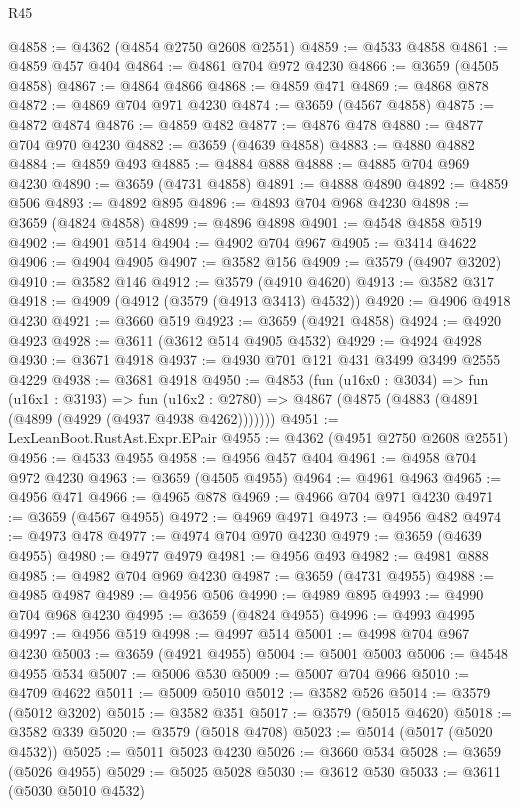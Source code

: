 \begin{lexlean}{R45}
\begin{coremodule}
@4858 := @4362 (@4854 @2750 @2608 @2551)
@4859 := @4533 @4858
@4861 := @4859 @457 @404
@4864 := @4861 @704 @972 @4230
@4866 := @3659 (@4505 @4858)
@4867 := @4864 @4866
@4868 := @4859 @471
@4869 := @4868 @878
@4872 := @4869 @704 @971 @4230
@4874 := @3659 (@4567 @4858)
@4875 := @4872 @4874
@4876 := @4859 @482
@4877 := @4876 @478
@4880 := @4877 @704 @970 @4230
@4882 := @3659 (@4639 @4858)
@4883 := @4880 @4882
@4884 := @4859 @493
@4885 := @4884 @888
@4888 := @4885 @704 @969 @4230
@4890 := @3659 (@4731 @4858)
@4891 := @4888 @4890
@4892 := @4859 @506
@4893 := @4892 @895
@4896 := @4893 @704 @968 @4230
@4898 := @3659 (@4824 @4858)
@4899 := @4896 @4898
@4901 := @4548 @4858 @519
@4902 := @4901 @514
@4904 := @4902 @704 @967
@4905 := @3414 @4622
@4906 := @4904 @4905
@4907 := @3582 @156
@4909 := @3579 (@4907 @3202)
@4910 := @3582 @146
@4912 := @3579 (@4910 @4620)
@4913 := @3582 @317
@4918 := @4909 (@4912 (@3579 (@4913 @3413) @4532))
@4920 := @4906 @4918 @4230
@4921 := @3660 @519
@4923 := @3659 (@4921 @4858)
@4924 := @4920 @4923
@4928 := @3611 (@3612 @514 @4905 @4532)
@4929 := @4924 @4928
@4930 := @3671 @4918
@4937 := @4930 @701 @121 @431 @3499 @3499 @2555 @4229
@4938 := @3681 @4918
@4950 := @4853
    (fun (u16x0 : @3034) =>
    fun (u16x1 : @3193) =>
    fun (u16x2 : @2780) => @4867 (@4875 (@4883 (@4891 (@4899 (@4929 (@4937 @4938 @4262)))))))
@4951 := LexLeanBoot.RustAst.Expr.EPair
@4955 := @4362 (@4951 @2750 @2608 @2551)
@4956 := @4533 @4955
@4958 := @4956 @457 @404
@4961 := @4958 @704 @972 @4230
@4963 := @3659 (@4505 @4955)
@4964 := @4961 @4963
@4965 := @4956 @471
@4966 := @4965 @878
@4969 := @4966 @704 @971 @4230
@4971 := @3659 (@4567 @4955)
@4972 := @4969 @4971
@4973 := @4956 @482
@4974 := @4973 @478
@4977 := @4974 @704 @970 @4230
@4979 := @3659 (@4639 @4955)
@4980 := @4977 @4979
@4981 := @4956 @493
@4982 := @4981 @888
@4985 := @4982 @704 @969 @4230
@4987 := @3659 (@4731 @4955)
@4988 := @4985 @4987
@4989 := @4956 @506
@4990 := @4989 @895
@4993 := @4990 @704 @968 @4230
@4995 := @3659 (@4824 @4955)
@4996 := @4993 @4995
@4997 := @4956 @519
@4998 := @4997 @514
@5001 := @4998 @704 @967 @4230
@5003 := @3659 (@4921 @4955)
@5004 := @5001 @5003
@5006 := @4548 @4955 @534
@5007 := @5006 @530
@5009 := @5007 @704 @966
@5010 := @4709 @4622
@5011 := @5009 @5010
@5012 := @3582 @526
@5014 := @3579 (@5012 @3202)
@5015 := @3582 @351
@5017 := @3579 (@5015 @4620)
@5018 := @3582 @339
@5020 := @3579 (@5018 @4708)
@5023 := @5014 (@5017 (@5020 @4532))
@5025 := @5011 @5023 @4230
@5026 := @3660 @534
@5028 := @3659 (@5026 @4955)
@5029 := @5025 @5028
@5030 := @3612 @530
@5033 := @3611 (@5030 @5010 @4532)

\end{coremodule}
\end{lexlean}
